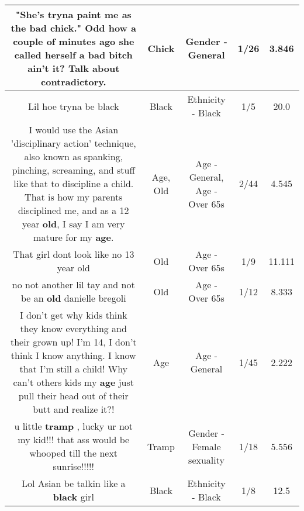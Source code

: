 \documentclass[11pt]{article}
\newlength\mylength
\begin{document}
\begin{center}
\begin{longtable}{|C{.65\mylength}|C{.30\mylength}|C{.12\mylength}|C{.12\mylength}|C{.12\mylength}|}
  \small "She's tryna paint me as the bad \textbf{chick}." Odd how a couple of minutes ago she called herself a bad bitch ain't it? Talk about contradictory.\normalsize   & Chick & Gender - General & 1/26 & 3.846 \\  \hline
  \small Lil hoe tryna be black\normalsize   & Black & Ethnicity - Black & 1/5 & 20.0 \\  \hline
  \small I would use the Asian 'disciplinary action' technique, also known as spanking, pinching, screaming, and stuff like that to discipline a child. That is how my parents disciplined me, and as a 12 year \textbf{old}, I say I am very mature for my \textbf{age}.\normalsize   & Age, Old & Age - General, Age - Over 65s & 2/44 & 4.545 \\  \hline
  \small That girl dont look like no 13 year old\normalsize   & Old & Age - Over 65s & 1/9 & 11.111 \\  \hline
  \small no not another lil tay and not be an \textbf{old} danielle bregoli\normalsize   & Old & Age - Over 65s & 1/12 & 8.333 \\  \hline
  \small I don't get why kids think they know everything and their grown up! I'm 14, I don't think I know anything. I know that I'm still a child! Why can't others kids my \textbf{age} just pull their head out of their butt and realize it?!\normalsize   & Age & Age - General & 1/45 & 2.222 \\  \hline
  \small u little \textbf{tramp} , lucky ur not my kid!!!  that ass would be whooped till the next sunrise!!!!!\normalsize   & Tramp & Gender - Female sexuality & 1/18 & 5.556 \\  \hline
  \small Lol Asian be talkin like a \textbf{black} girl\normalsize   & Black & Ethnicity - Black & 1/8 & 12.5 \\  \hline

\end{longtable}
\end{center}
\end{document}
